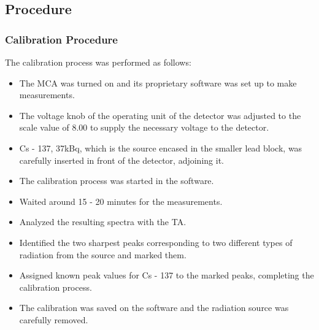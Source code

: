 	\subsection{Procedure}
	
		\subsubsection{Calibration Procedure}
			The calibration process was performed as follows:
				\begin{itemize}
					\item The MCA was turned on and its proprietary software was set up to make measurements.
					\item The voltage knob of the operating unit of the detector was adjusted to the scale value of 8.00 to supply the necessary voltage to the detector. 
					\item Cs - 137, 37kBq, which is the source encased in the smaller lead block, was carefully inserted in front of the detector, adjoining it. 
					\item The calibration process was started in the software.
					\item Waited around 15 - 20 minutes for the measurements.
					\item Analyzed the resulting spectra with the TA.
					\item Identified the two sharpest peaks corresponding to two different types of radiation from the source and marked them.
					\item Assigned known peak values for Cs - 137 to the marked peaks, completing the calibration process.
					\item The calibration was saved on the software and the radiation source was carefully removed.
				\end{itemize}
		
